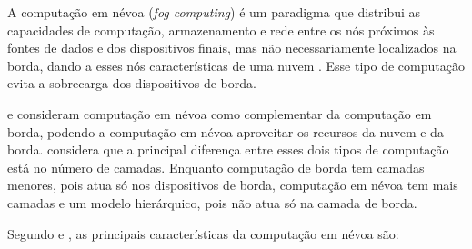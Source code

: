 A computação em névoa (\emph{fog computing}) é um paradigma que distribui
as capacidades de computação, armazenamento e rede entre os nós próximos
às fontes de dados
e dos dispositivos finais, mas não necessariamente localizados na borda,
dando a esses nós características de uma nuvem
\cite{Bonomi2012,Dastjerdi2016,IEEECommunicationsSociety2018}.
Esse tipo de computação evita a sobrecarga dos dispositivos de borda.

 e
 consideram computação em névoa como complementar da
computação em borda, podendo a computação em névoa aproveitar os recursos da
nuvem e da borda.
 considera que a
principal diferença entre esses dois tipos de computação está no número de
camadas.
Enquanto computação de borda tem
camadas menores, pois atua só nos
dispositivos de borda, computação em névoa tem mais camadas e um modelo
hierárquico, pois não atua só na camada de borda.

Segundo  e , as principais
características da computação em névoa são:

